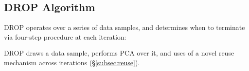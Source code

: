 \subsection{DROP Algorithm}
\label{subsec:arch}
DROP operates over a series of data samples, and determines when to terminate via  four-step procedure at each iteration: %

\noindent DROP draws a data sample, performs PCA over it, and uses of a novel reuse mechanism across iterations (\S\ref{subsec:reuse}).


